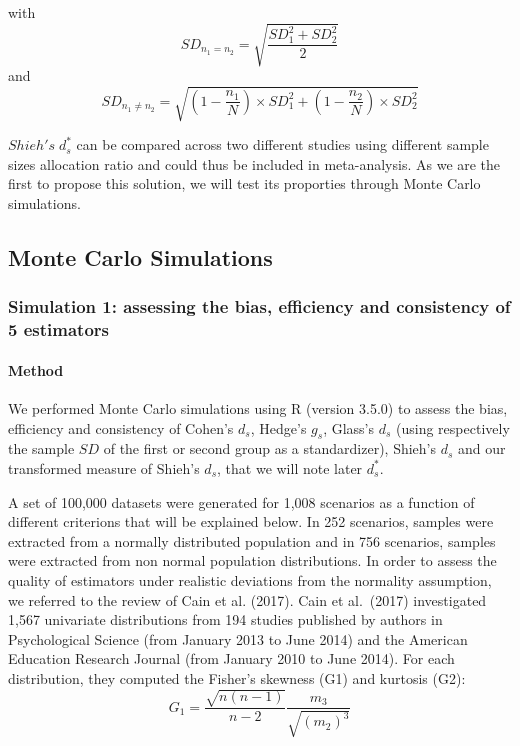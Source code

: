 \documentclass[
  man,floatsintext]{apa6}
\begin{document}
with \[SD_{n_1=n_2}= \sqrt{\frac{SD_1^2+SD_2^2}{2}}\] and
\[SD_{n_1 \neq n_2} = \sqrt{(1- \frac{n_1}{N}) \times SD_1^2+(1- \frac{n_2}{N}) \times SD_2^2}\]

\(Shieh's \; d^*_s\) can be compared across two different studies using different sample sizes allocation ratio and could thus be included in meta-analysis. As we are the first to propose this solution, we will test its proporties through Monte Carlo simulations.

\hypertarget{monte-carlo-simulations}{%
\subsection{Monte Carlo Simulations}\label{monte-carlo-simulations}}

\hypertarget{simulation-1-assessing-the-bias-efficiency-and-consistency-of-5-estimators}{%
\subsubsection{Simulation 1: assessing the bias, efficiency and consistency of 5 estimators}\label{simulation-1-assessing-the-bias-efficiency-and-consistency-of-5-estimators}}

\hypertarget{method}{%
\paragraph{Method}\label{method}}

We performed Monte Carlo simulations using R (version 3.5.0) to assess the bias, efficiency and consistency of Cohen's \(d_s\), Hedge's \(g_s\), Glass's \(d_s\) (using respectively the sample \(SD\) of the first or second group as a standardizer), Shieh's \(d_s\) and our transformed measure of Shieh's \(d_s\), that we will note later \(d_s^*\).

A set of 100,000 datasets were generated for 1,008 scenarios as a function of different criterions that will be explained below. In 252 scenarios, samples were extracted from a normally distributed population and in 756 scenarios, samples were extracted from non normal population distributions. In order to assess the quality of estimators under realistic deviations from the normality assumption, we referred to the review of Cain et al. (2017). Cain et al.~(2017) investigated 1,567 univariate distributions from 194 studies published by authors in Psychological Science (from January 2013 to June 2014) and the American Education Research Journal (from January 2010 to June 2014). For each distribution, they computed the Fisher's skewness (G1) and kurtosis (G2):
\begin{equation} 
G_{1}=\frac{\sqrt{n(n-1)}}{n-2} \frac{m_{3}}{\sqrt{(m_{2})^3}}
\label{eq:skew}
\end{equation}
\end{document}
